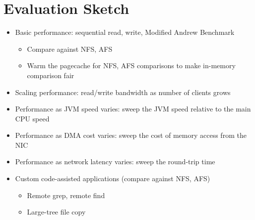 \documentclass[10pt]{article}
\begin{document}
\section{Evaluation Sketch}

\begin{itemize}
\item Basic performance: sequential read, write, Modified Andrew
  Benchmark
\begin{itemize}
\item Compare against NFS, AFS
\item Warm the pagecache for NFS, AFS comparisons to make in-memory
  comparison fair
\end{itemize}
\item Scaling performance: read/write bandwidth as number of clients grows
\item Performance as JVM speed varies: sweep the JVM speed relative to
  the main CPU speed
\item Performance as DMA cost varies: sweep the cost of memory access
  from the NIC
\item Performance as network latency varies: sweep the round-trip time
\item Custom code-assisted applications (compare against NFS, AFS)
\begin{itemize}
\item Remote grep, remote find
\item Large-tree file copy
\end{itemize}
\end{itemize}

 
\end{document}

